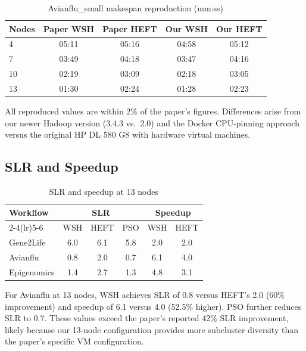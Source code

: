 \documentclass[10pt,twocolumn]{article}
\begin{document}
\begin{table}[H]
\centering
\caption{Avianflu\_small makespan reproduction (mm:ss)}
\label{tab:repro_avian}
\begin{tabular}{@{}lcccc@{}}
\toprule
\textbf{Nodes} & \textbf{Paper WSH} & \textbf{Paper HEFT} & \textbf{Our WSH} & \textbf{Our HEFT}\\
\midrule
4  & 05:11 & 05:16 & 04:58 & 05:12 \\
7  & 03:49 & 04:18 & 03:47 & 04:16 \\
10 & 02:19 & 03:09 & 02:18 & 03:05 \\
13 & 01:30 & 02:24 & 01:28 & 02:23 \\
\bottomrule
\end{tabular}
\end{table}

All reproduced values are within 2\% of the paper's figures. Differences arise
from our newer Hadoop version (3.4.3 vs.\ 2.0) and the Docker CPU-pinning approach
versus the original HP DL 580 G8 with hardware virtual machines.

\subsection{SLR and Speedup}

\begin{table}[H]
\centering
\caption{SLR and speedup at 13 nodes}
\label{tab:slr_speedup}
\begin{tabular}{@{}lccccc@{}}
\toprule
\textbf{Workflow} & \multicolumn{3}{c}{\textbf{SLR}} & \multicolumn{2}{c}{\textbf{Speedup}}\\
\cmidrule(lr){2-4}\cmidrule(lr){5-6}
 & WSH & HEFT & PSO & WSH & HEFT\\
\midrule
Gene2Life   & 6.0 & 6.1 & 5.8 & 2.0 & 2.0 \\
Avianflu    & 0.8 & 2.0 & 0.7 & 6.1 & 4.0 \\
Epigenomics & 1.4 & 2.7 & 1.3 & 4.8 & 3.1 \\
\bottomrule
\end{tabular}
\end{table}

For Avianflu at 13 nodes, WSH achieves SLR of 0.8 versus HEFT's 2.0 (60\%
improvement) and speedup of 6.1 versus 4.0 (52.5\% higher). PSO further reduces
SLR to 0.7. These values exceed the paper's reported 42\% SLR improvement, likely
because our 13-node configuration provides more subcluster diversity than the
paper's specific VM configuration.
\end{document}
